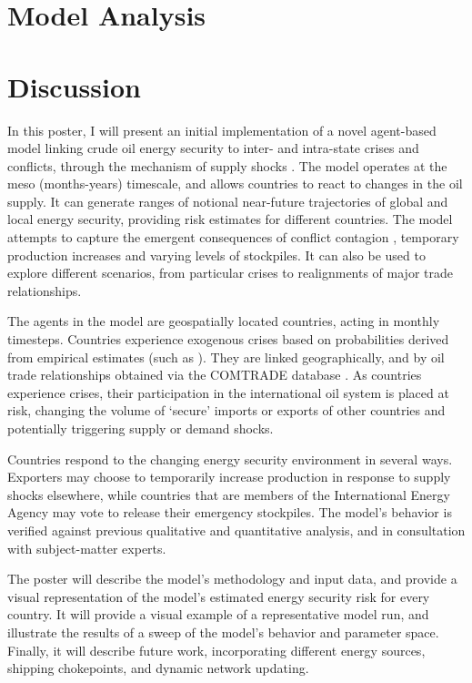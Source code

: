 \documentclass{article}
\begin{document}
\section{Model Analysis}

\section{Discussion}



In this poster, I will present an initial implementation of a novel agent-based model linking crude oil energy security to inter- and intra-state crises and conflicts, through the mechanism of supply shocks \citep{kilian_2008}. The model operates at the meso (months-years) timescale, and allows countries to react to changes in the oil supply. It can generate ranges of notional near-future trajectories of global and local energy security, providing risk estimates for different countries. The model attempts to capture the emergent consequences of conflict contagion \citep{black_2013}, temporary production increases and varying levels of stockpiles. It can also be used to explore different scenarios, from particular crises to realignments of major trade relationships. 

The agents in the model are geospatially located countries, acting in monthly timesteps. Countries experience exogenous crises based on probabilities derived from empirical estimates (such as \citep{goldstone_2005,eiu_2013,ward_2013}). They are linked geographically, and by oil trade relationships obtained via the COMTRADE database \citep{un_2013}. As countries experience crises, their participation in the  international oil system is placed at risk, changing the volume of `secure' imports or exports of other countries and  potentially triggering supply or demand shocks. 

Countries respond to the changing energy security environment in several ways. Exporters may choose to temporarily increase production in response to supply shocks elsewhere, while countries that are members of the International Energy Agency may vote to release their emergency stockpiles. The model's behavior is verified against previous qualitative and quantitative analysis, and in consultation with subject-matter experts. 

The poster will describe the model's methodology and input data, and provide a visual representation of the model's estimated energy security risk for every country. It will provide a visual example of a representative model run, and illustrate the results of a sweep of the model's behavior and parameter space. Finally, it will describe future work, incorporating different energy sources, shipping chokepoints, and dynamic network updating.

 

\end{document}
